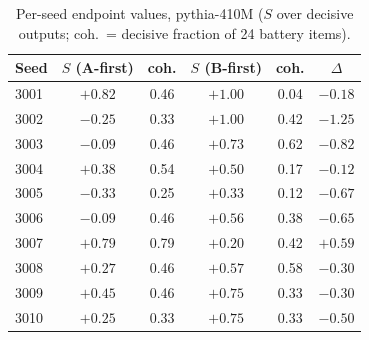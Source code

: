 \begin{table}[t]
\centering
\caption{Per-seed endpoint values, pythia-410M ($S$ over decisive outputs;
coh.\ = decisive fraction of 24 battery items).}
\label{tab:endpoint-per-seed}
\small
\begin{tabular}{lccccc}
\toprule
Seed & $S$ (A-first) & coh. & $S$ (B-first) & coh. & $\Delta$ \\
\midrule
3001 & $+0.82$ & 0.46 & $+1.00$ & 0.04 & $-0.18$ \\
3002 & $-0.25$ & 0.33 & $+1.00$ & 0.42 & $-1.25$ \\
3003 & $-0.09$ & 0.46 & $+0.73$ & 0.62 & $-0.82$ \\
3004 & $+0.38$ & 0.54 & $+0.50$ & 0.17 & $-0.12$ \\
3005 & $-0.33$ & 0.25 & $+0.33$ & 0.12 & $-0.67$ \\
3006 & $-0.09$ & 0.46 & $+0.56$ & 0.38 & $-0.65$ \\
3007 & $+0.79$ & 0.79 & $+0.20$ & 0.42 & $+0.59$ \\
3008 & $+0.27$ & 0.46 & $+0.57$ & 0.58 & $-0.30$ \\
3009 & $+0.45$ & 0.46 & $+0.75$ & 0.33 & $-0.30$ \\
3010 & $+0.25$ & 0.33 & $+0.75$ & 0.33 & $-0.50$ \\
\bottomrule
\end{tabular}
\end{table}
